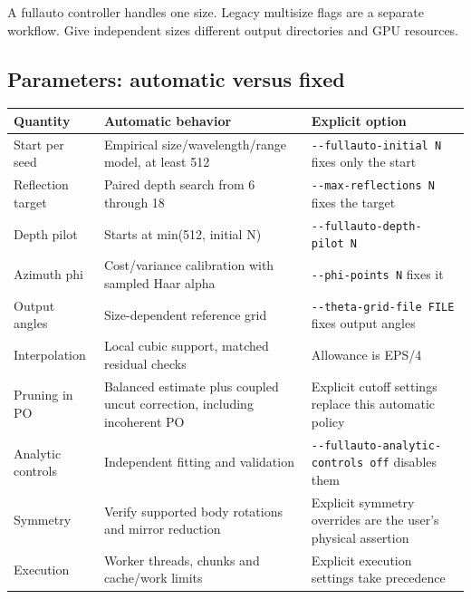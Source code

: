 A fullauto controller handles one size. Legacy multisize flags are a
separate workflow. Give independent sizes different output directories
and GPU resources.

\subsection{Parameters: automatic versus
fixed}\label{parameters-automatic-versus-fixed}

\begin{longtable}[]{@{}
  >{\raggedright\arraybackslash}p{}
  >{\raggedright\arraybackslash}p{}
  >{\raggedright\arraybackslash}p{}@{}}
\toprule\noalign{}
\begin{minipage}[b]{\linewidth}\raggedright
Quantity
\end{minipage} & \begin{minipage}[b]{\linewidth}\raggedright
Automatic behavior
\end{minipage} & \begin{minipage}[b]{\linewidth}\raggedright
Explicit option
\end{minipage} \\
\midrule\noalign{}
\endhead
\bottomrule\noalign{}
\endlastfoot
Start per seed & Empirical size/wavelength/range model, at least 512 &
\texttt{-\/-fullauto-initial\ N} fixes only the start \\
Reflection target & Paired depth search from 6 through 18 &
\texttt{-\/-max-reflections\ N} fixes the target \\
Depth pilot & Starts at min(512, initial N) &
\texttt{-\/-fullauto-depth-pilot\ N} \\
Azimuth phi & Cost/variance calibration with sampled Haar alpha &
\texttt{-\/-phi-points\ N} fixes it \\
Output angles & Size-dependent reference grid &
\texttt{-\/-theta-grid-file\ FILE} fixes output angles \\
Interpolation & Local cubic support, matched residual checks & Allowance
is EPS/4 \\
Pruning in PO & Balanced estimate plus coupled uncut correction,
including incoherent PO & Explicit cutoff settings replace this
automatic policy \\
Analytic controls & Independent fitting and validation &
\texttt{-\/-fullauto-analytic-controls\ off} disables them \\
Symmetry & Verify supported body rotations and mirror reduction &
Explicit symmetry overrides are the user's physical assertion \\
Execution & Worker threads, chunks and cache/work limits & Explicit
execution settings take precedence \\
\end{longtable}

